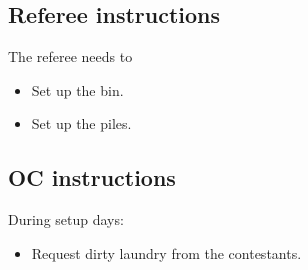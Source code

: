 \subsection{Referee instructions}
The referee needs to
\begin{itemize}
	\item Set up the bin.
	\item Set up the piles.
\end{itemize}

\subsection{OC instructions}
During setup days:
\begin{itemize}
	\item Request dirty laundry from the contestants.
\end{itemize}
